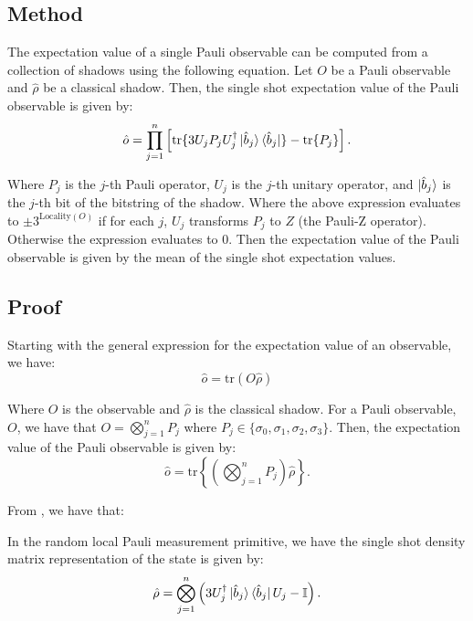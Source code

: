 \documentclass[12pt]{article}
\begin{document}
    \subsection{Method}
    The expectation value of a single Pauli observable can be computed from a collection of shadows using the following equation. Let $O$ be a Pauli observable and $\hat{\rho}$ be a classical shadow. Then, the single shot expectation value of the Pauli observable is given by:
    \begin{equation}
        \hat{o} = \prod_{j=1}^n \left[ \text{tr}\{ 3 U_jP_j U^\dagger_j \ket{\hat{b}_j}\bra{\hat{b}_j}\} - \text{tr}\{ P_j \} \right].
    \end{equation}

    Where $P_j$ is the $j$-th Pauli operator, $U_j$ is the $j$-th unitary operator, and $\ket{\hat{b}_j}$ is the $j$-th bit of the bitstring of the shadow. Where the above expression evaluates to $\pm3^{\text{Locality}(O)}$ if for each $j$, $U_j$ transforms $P_j$ to $Z$ (the Pauli-Z operator). Otherwise the expression evaluates to 0. Then the expectation value of the Pauli observable is given by the mean of the single shot expectation values.
    
    \subsection{Proof}
    Starting with the general expression for the expectation value of an observable, we have:
    \begin{equation*}
        \hat{o} = \text{tr}(O\hat{\rho})
    \end{equation*}
    
    Where $O$ is the observable and $\hat{\rho}$ is the classical shadow. For a Pauli observable, $O$, we have that $O = \bigotimes_{j=1}^n P_j$ where $P_j \in \{ \sigma_0, \sigma_1, \sigma_2, \sigma_3 \}$. Then, the expectation value of the Pauli observable is given by:
    \begin{equation*}
        \hat{o} = \text{tr}\left\{\left( \bigotimes_{j=1}^n P_j \right) \hat{\rho}\right\}.
    \end{equation*}

    From \cite{Huang_Kueng_Preskill_2020}, we have that:
    \begin{theorem}
        In the random local Pauli measurement primitive, we have the single shot density matrix representation of the state is given by:
        \begin{equation}
            \hat{\rho} = \bigotimes^n_{j=1}\left(3U_j^\dagger\ket{\hat{b}_j}\bra{\hat{b}_j}U_j - \mathbb{I} \right).
        \end{equation}
    \end{theorem}
\end{document}
